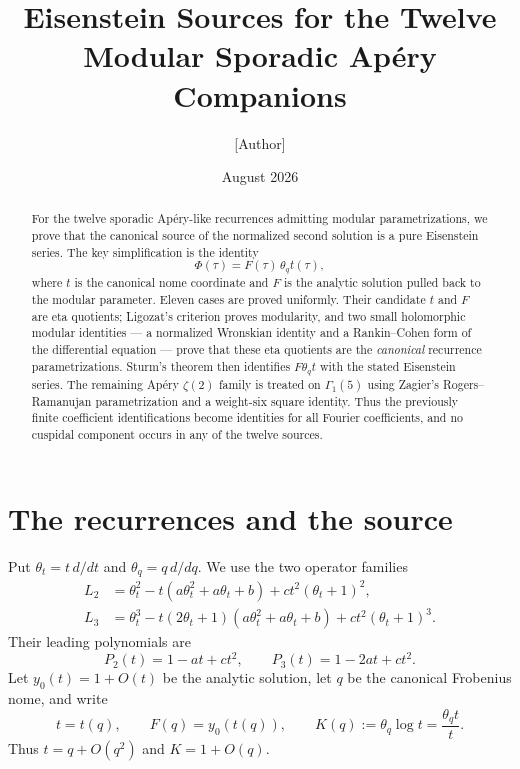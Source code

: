 \documentclass[11pt]{article}
\title{Eisenstein Sources for the Twelve Modular Sporadic Ap\'ery Companions}
\author{[Author]}
\date{August 2026}
\theoremstyle{remark}
\newcommand{\tht}{\theta_t}
\newcommand{\thq}{\theta_q}
\begin{document}
\maketitle

\begin{abstract}
For the twelve sporadic Ap\'ery-like recurrences admitting modular
parametrizations, we prove that the canonical source of the normalized second
solution is a pure Eisenstein series.  The key simplification is the identity
\[
   \Phi(\tau)=F(\tau)\,\theta_q t(\tau),
\]
where $t$ is the canonical nome coordinate and $F$ is the analytic solution
pulled back to the modular parameter.  Eleven cases are proved uniformly.
Their candidate $t$ and $F$ are eta quotients; Ligozat's criterion proves
modularity, and two small holomorphic modular identities --- a normalized
Wronskian identity and a Rankin--Cohen form of the differential equation ---
prove that these eta quotients are the \emph{canonical} recurrence
parametrizations.  Sturm's theorem then identifies $F\theta_qt$ with the
stated Eisenstein series.  The remaining Ap\'ery $\zeta(2)$ family is treated
on $\Gamma_1(5)$ using Zagier's Rogers--Ramanujan parametrization and a
weight-six square identity.  Thus the previously finite coefficient
identifications become identities for all Fourier coefficients, and no
cuspidal component occurs in any of the twelve sources.
\end{abstract}

\section{The recurrences and the source}

Put $\tht=t\,d/dt$ and $\thq=q\,d/dq$.  We use the two operator families
\begin{align}
L_2&=\tht^2-t(a\tht^2+a\tht+b)+ct^2(\tht+1)^2,
\label{eq:L2}\\
L_3&=\tht^3-t(2\tht+1)(a\tht^2+a\tht+b)+ct^2(\tht+1)^3.
\label{eq:L3}
\end{align}
Their leading polynomials are
\[
P_2(t)=1-at+ct^2,\qquad P_3(t)=1-2at+ct^2.
\]
Let $y_0(t)=1+O(t)$ be the analytic solution, let $q$ be the canonical
Frobenius nome, and write
\[
  t=t(q),\qquad F(q)=y_0(t(q)),\qquad
  K(q):=\thq\log t=\frac{\thq t}{t}.
\]
Thus $t=q+O(q^2)$ and $K=1+O(q)$.
\end{document}
